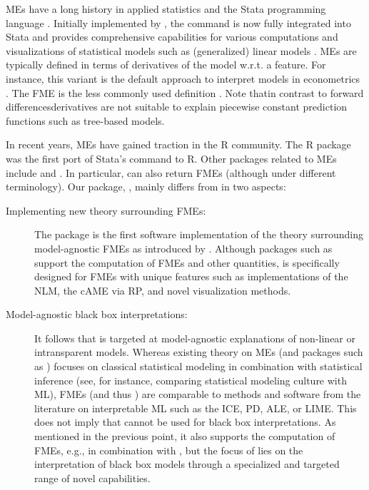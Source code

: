 MEs have a long history in applied statistics and the Stata programming language \citep{stata_manual}. Initially implemented by \citet{bartus_marginal_effects}, the  command is now fully integrated into Stata and provides comprehensive capabilities for various computations and visualizations of statistical models such as (generalized) linear models \citep{williams_margins}. MEs are typically defined in terms of derivatives of the model w.r.t. a feature. For instance, this variant is the default approach to interpret models in econometrics \citep{greene_econometric_analysis}. The FME is the less commonly used definition \citep{scholbeck_fme, mize_discrete_change}. Note that\textemdash in contrast to forward differences\textemdash derivatives are not suitable to explain piecewise constant prediction functions such as tree-based models. 
\par
In recent years, MEs have gained traction in the R community. The R package  \citep{leeper_margins} was the first port of Stata's  command to R. Other packages related to MEs include  \citep{ggeffects} and  \citep{marginaleffects}. In particular,  can also return FMEs (although under different terminology). Our package, , mainly differs from  in two aspects:
\begin{description}
    \item[Implementing new theory surrounding FMEs:] The  package is the first software implementation of the theory surrounding model-agnostic FMEs as introduced by \citet{scholbeck_fme}. Although packages such as  support the computation of FMEs and other quantities,  is specifically designed for FMEs with unique features such as implementations of the NLM, the cAME via RP, and novel visualization methods.
    \item[Model-agnostic black box interpretations:] 
    It follows that  is targeted at model-agnostic explanations of non-linear or intransparent models. Whereas existing theory on MEs (and packages such as ) focuses on classical statistical modeling in combination with statistical inference (see, for instance, \citet{breiman_two_cultures} comparing statistical modeling culture with ML), FMEs (and thus ) are comparable to methods and software from the literature on interpretable ML such as the ICE, PD, ALE, or LIME. This does not imply that  cannot be used for black box interpretations. As mentioned in the previous point, it also supports the computation of FMEs, e.g., in combination with , but the focus of  lies on the interpretation of black box models through a specialized and targeted range of novel capabilities.
\end{description}


